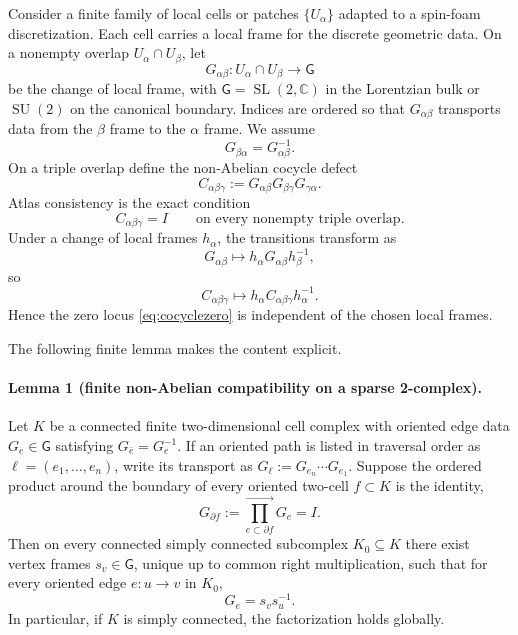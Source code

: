 \documentclass[aps,prd,reprint,nofootinbib,superscriptaddress]{revtex4-2}
\newcommand{\C}{\mathbb C}
\newcommand{\SL}{\operatorname{SL}}
\newcommand{\SU}{\operatorname{SU}}
\begin{document}
Consider a finite family of local cells or patches $\{U_\alpha\}$ adapted to a spin-foam discretization. Each cell carries a local frame for the discrete geometric data. On a nonempty overlap $U_\alpha\cap U_\beta$, let
\begin{equation}
G_{\alpha\beta}:U_\alpha\cap U_\beta\longrightarrow\mathsf G
\label{eq:transition}
\end{equation}
be the change of local frame, with $\mathsf G=\SL(2,\C)$ in the Lorentzian bulk or $\SU(2)$ on the canonical boundary. Indices are ordered so that $G_{\alpha\beta}$ transports data from the $\beta$ frame to the $\alpha$ frame. We assume
\begin{equation}
G_{\beta\alpha}=G_{\alpha\beta}^{-1}.
\label{eq:inverse-transition}
\end{equation}
On a triple overlap define the non-Abelian cocycle defect
\begin{equation}
C_{\alpha\beta\gamma}
:=
G_{\alpha\beta}G_{\beta\gamma}G_{\gamma\alpha}.
\label{eq:cocycledefect}
\end{equation}
Atlas consistency is the exact condition
\begin{equation}
\boxed{C_{\alpha\beta\gamma}=I}
\qquad
\text{on every nonempty triple overlap.}
\label{eq:cocyclezero}
\end{equation}
Under a change of local frames $h_\alpha$, the transitions transform as
\begin{equation}
G_{\alpha\beta}\mapsto h_\alpha G_{\alpha\beta}h_\beta^{-1},
\end{equation}
so
\begin{equation}
C_{\alpha\beta\gamma}
\mapsto
h_\alpha C_{\alpha\beta\gamma}h_\alpha^{-1}.
\label{eq:cocyclegauge}
\end{equation}
Hence the zero locus \eqref{eq:cocyclezero} is independent of the chosen local frames.

The following finite lemma makes the content explicit.

\paragraph{Lemma 1 (finite non-Abelian compatibility on a sparse 2-complex).}
Let $K$ be a connected finite two-dimensional cell complex with oriented edge data $G_e\in\mathsf G$ satisfying $G_{\bar e}=G_e^{-1}$. If an oriented path is listed in traversal order as $\ell=(e_1,\ldots,e_n)$, write its transport as $G_\ell:=G_{e_n}\cdots G_{e_1}$. Suppose the ordered product around the boundary of every oriented two-cell $f\subset K$ is the identity,
\begin{equation}
G_{\partial f}
:=
\overrightarrow{\prod_{e\subset\partial f}}G_e
=I.
\label{eq:facecocycle}
\end{equation}
Then on every connected simply connected subcomplex $K_0\subseteq K$ there exist vertex frames $s_v\in\mathsf G$, unique up to common right multiplication, such that for every oriented edge $e:u\to v$ in $K_0$,
\begin{equation}
\boxed{G_e=s_v s_u^{-1}.}
\label{eq:puregaugeframes}
\end{equation}
In particular, if $K$ is simply connected, the factorization holds globally.
\end{document}
